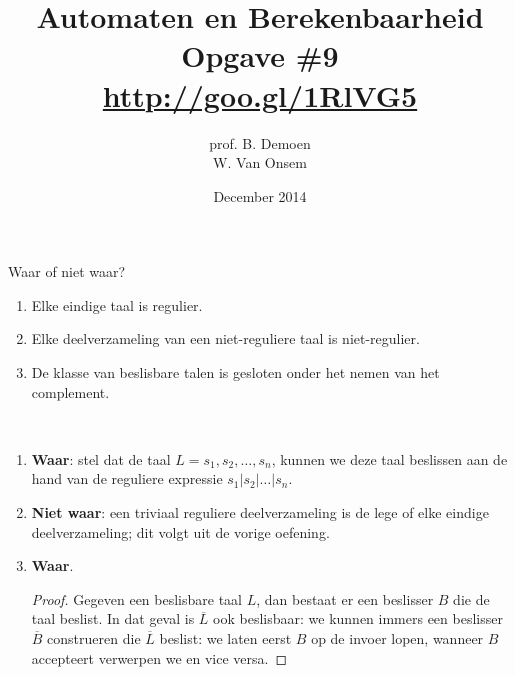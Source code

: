 \documentclass[a4paper]{article}
\title{Automaten en Berekenbaarheid\\Opgave \#9\\\url{http://goo.gl/1RlVG5}}
\author{prof. B. Demoen\\W. Van Onsem}
\date{December 2014}
\begin{document}
\maketitle

\begin{question}
Waar of niet waar?
\begin{enumerate}
  \item Elke eindige taal is regulier.
  \item Elke deelverzameling van een niet-reguliere taal is niet-regulier.
  \item De klasse van beslisbare talen is gesloten onder het nemen van het complement.
\end{enumerate}
\begin{answer}~~
\begin{enumerate}
 \item \textbf{Waar}: stel dat de taal $L={s_1,s_2,\ldots,s_n}$, kunnen we deze taal beslissen aan de hand van de reguliere expressie $s_1|s_2|\ldots|s_n$.
 \item \textbf{Niet waar}: een triviaal reguliere deelverzameling is de lege of elke eindige deelverzameling; dit volgt uit de vorige oefening.
 \item \textbf{Waar}.
 \begin{proof}
  Gegeven een beslisbare taal $L$, dan bestaat er een beslisser $B$ die de taal beslist. In dat geval is $\overline{L}$ ook beslisbaar: we kunnen immers een beslisser $\overline{B}$ construeren die $\overline{L}$ beslist: we laten eerst $B$ op de invoer lopen, wanneer $B$ accepteert verwerpen we en vice versa.
 \end{proof}
\end{enumerate}
\end{answer}
\end{question}
\end{document}
